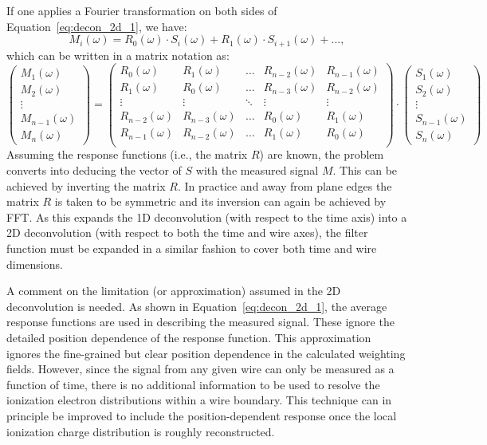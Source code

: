 If one applies a Fourier transformation on both sides of Equation~\ref{eq:decon_2d_1},
we have:
\begin{equation}\label{eq:decon_2d_2}
M_i(\omega) = R_0(\omega) \cdot S_i(\omega) + R_1(\omega) \cdot S_{i+1} (\omega) + ...,
\end{equation} 
which can be written in a matrix notation as:
\begin{equation}
\begin{pmatrix}
    M_1(\omega)\\
    M_2(\omega)\\
    \vdots\\
    M_{n-1}(\omega)\\
    M_{n}(\omega)
\end{pmatrix}
=
\begin{pmatrix}
R_0(\omega) & R_1(\omega) & \ldots & R_{n-2}(\omega) & R_{n-1}(\omega) \\
R_1(\omega) & R_0(\omega) & \ldots & R_{n-3}(\omega) & R_{n-2}(\omega) \\
    \vdots  & \vdots      & \ddots & \vdots          & \vdots \\
    R_{n-2}(\omega) & R_{n-3}(\omega) & \ldots & R_0(\omega) & R_1(\omega) \\
    R_{n-1}(\omega) & R_{n-2}(\omega) & \ldots & R_1(\omega) & R_0(\omega) \\
\end{pmatrix}
\cdot
\begin{pmatrix}
    S_1(\omega)\\
    S_2(\omega)\\
    \vdots\\
    S_{n-1}(\omega)\\
    S_{n}(\omega)
\end{pmatrix}
\label{eq:matrix_expansion}
\end{equation}
Assuming the response functions (i.e., the matrix $R$) are known, the 
problem converts into deducing the vector of $S$ with the measured signal $M$. 
%
This can be achieved by inverting the matrix $R$. In practice and away
from plane edges the matrix $R$ is taken to be symmetric and its
inversion can again be achieved by FFT.
%
As this expands the 1D deconvolution (with respect to the time axis)
into a 2D deconvolution (with respect to both the time and wire
axes), the filter function must be expanded in a similar fashion to cover
both time and wire dimensions.

A comment on the limitation (or approximation) 
assumed in the 2D deconvolution is needed. As shown in Equation~\ref{eq:decon_2d_1}, the 
average response functions are used in describing the measured signal. These 
ignore the detailed position dependence of the response function. 
This approximation ignores the fine-grained but clear position
dependence in the calculated weighting fields.
However, since the signal from any given wire can only be measured as
a function of time, there is no additional information to be used to
resolve the ionization electron distributions within a wire boundary.
This technique can in principle be improved to include the position-dependent
response once the local ionization charge distribution is roughly reconstructed. 

